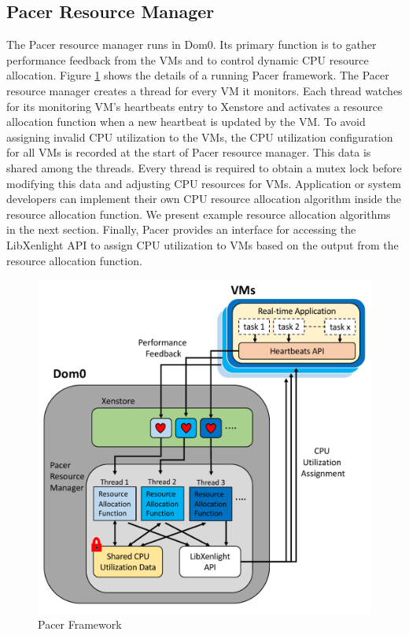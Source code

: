 \subsection{Pacer Resource Manager}
The Pacer resource manager runs in Dom0. Its primary function is to gather performance feedback from the VMs and to control dynamic CPU resource allocation. Figure \ref{anchorsd} shows the details of a running Pacer framework. The Pacer resource manager creates a thread for every VM it monitors. Each thread watches for its monitoring VM's heartbeats entry to Xenstore and activates a resource allocation function when a new heartbeat is updated by the VM. To avoid assigning invalid CPU utilization to the VMs, the CPU utilization configuration for all VMs is recorded at the start of Pacer resource manager. This data is shared among the threads. Every thread is required to obtain a mutex lock before modifying this data and adjusting CPU resources for VMs. Application or system developers can implement their own CPU resource allocation algorithm inside the resource allocation function. We present example resource allocation algorithms in the next section. Finally, Pacer provides an interface for accessing the LibXenlight API to assign CPU utilization to VMs based on the output from the resource allocation function. 
\begin{figure}[h!]
\centering
\includegraphics[width=1\linewidth]{images/anchorsd}
\caption{Pacer Framework}
\label{anchorsd}
\end{figure}
